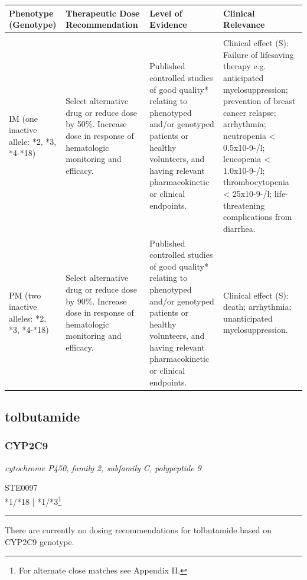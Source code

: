 \documentclass{report}
\begin{document}
      \begin{tabularx}{\textwidth}{ XXXX }
      \textbf{ Phenotype (Genotype) }&\textbf{ Therapeutic Dose Recommendation }&\textbf{ Level of Evidence }&\textbf{ Clinical Relevance } \\ \hline \\  IM (one inactive allele: *2, *3, *4-*18) & Select alternative drug or reduce dose by 50\%. Increase dose in response of hematologic monitoring and efficacy. & Published controlled studies of good quality* relating to phenotyped and/or genotyped patients or healthy volunteers, and having relevant pharmacokinetic or clinical endpoints. & Clinical effect (S): Failure of lifesaving therapy e.g. anticipated myelosuppression; prevention of breast cancer relapse; arrhythmia; neutropenia < 0.5x10-9-/l; leucopenia < 1.0x10-9-/l; thrombocytopenia < 25x10-9-/l; life-threatening complications from diarrhea.  \\  PM (two inactive alleles: *2, *3, *4-*18) & Select alternative drug or reduce dose by 90\%. Increase dose in response of hematologic monitoring and efficacy. & Published controlled studies of good quality* relating to phenotyped and/or genotyped patients or healthy volunteers, and having relevant pharmacokinetic or clinical endpoints. & Clinical effect (S): death; arrhythmia; unanticipated myelosuppression.  \\ 
      \end{tabularx}
      
      \normalsize









\subsection{ tolbutamide }

\subsubsection{ CYP2C9 }
     \textit{ cytochrome P450, family 2, subfamily C, polypeptide 9 } \begin{flushright} \textsc{ STE0097 \\ *1/*18  | *1/*3\footnote{For alternate close matches see Appendix II.} }\end{flushright}
      \hrule \vspace{6pt}
      There are currently no dosing recommendations for tolbutamide based on CYP2C9 genotype. \newline
      \scriptsize
      
\end{document}
